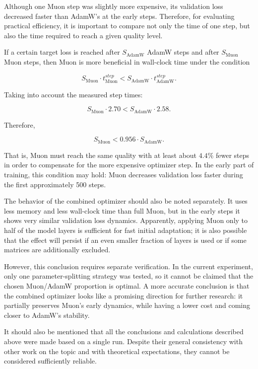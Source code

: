 \documentclass{article}
\begin{document}
Although one Muon step was slightly more expensive, its validation loss decreased faster than AdamW's at the early steps. Therefore, for evaluating practical efficiency, it is important to compare not only the time of one step, but also the time required to reach a given quality level.

If a certain target loss is reached after $S_{\text{AdamW}}$ AdamW steps and after $S_{\text{Muon}}$ Muon steps, then Muon is more beneficial in wall-clock time under the condition

$$
S_{\text{Muon}} \cdot t^{step}_{\text{Muon}}
<
S_{\text{AdamW}} \cdot t^{step}_{\text{AdamW}}.
$$

Taking into account the measured step times:

$$
S_{\text{Muon}} \cdot 2.70
<
S_{\text{AdamW}} \cdot 2.58.
$$

Therefore,

$$
S_{\text{Muon}}
<
0.956 \cdot S_{\text{AdamW}}.
$$

That is, Muon must reach the same quality with at least about $4.4\%$ fewer steps in order to compensate for the more expensive optimizer step. In the early part of training, this condition may hold: Muon decreases validation loss faster during the first approximately 500 steps.

The behavior of the combined optimizer should also be noted separately. It uses less memory and less wall-clock time than full Muon, but in the early steps it shows very similar validation loss dynamics. Apparently, applying Muon only to half of the model layers is sufficient for fast initial adaptation; it is also possible that the effect will persist if an even smaller fraction of layers is used or if some matrices are additionally excluded.

However, this conclusion requires separate verification. In the current experiment, only one parameter-splitting strategy was tested, so it cannot be claimed that the chosen Muon/AdamW proportion is optimal. A more accurate conclusion is that the combined optimizer looks like a promising direction for further research: it partially preserves Muon's early dynamics, while having a lower cost and coming closer to AdamW's stability.

It should also be mentioned that all the conclusions and calculations described above were made based on a single run. Despite their general consistency with other work on the topic and with theoretical expectations, they cannot be considered sufficiently reliable.
\end{document}
